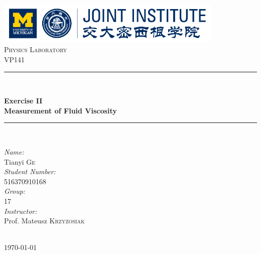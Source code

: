 \begin{titlepage}

\newcommand{\HRule}{\rule{\linewidth}{0.5mm}}

\center

\includegraphics[height=0.8in]{images/logo.png}\\[1cm]

\textsc{\Large Physics Laboratory}\\[0.4cm]
\textsc{\large VP141}\\[0.4cm]

\HRule \\[0.4cm]
{
    \bfseries
    {\huge Exercise II}\\[0.3cm]
    {\large Measurement of Fluid Viscosity}\\[0.2cm]
    \HRule \\[1.5cm]
}

\begin{minipage}{0.4\textwidth}

\large
\emph{Name:}\\
Tianyi \textsc{Ge} \\

\emph{Student Number:}\\
516370910168 \\

\emph{Group:}\\
17\\

\emph{Instructor:}\\
Prof. Mateusz \textsc{Krzyzosiak}

\end{minipage}\\[2cm]

{\large \today}\\[2cm]

\vfill

\end{titlepage}